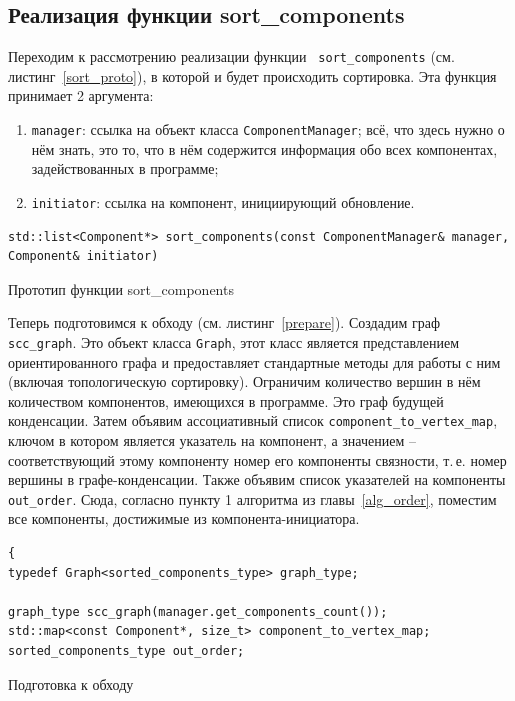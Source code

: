 \subsection{Реализация функции sort\_components}
Переходим к рассмотрению реализации функции \lstinline! sort_components! (см. листинг~\ref{sort_proto}), в которой и будет происходить сортировка. Эта функция принимает 2 аргумента:
\begin{enumerate}[1)]
	\item \lstinline!manager!: ссылка на объект класса \lstinline!ComponentManager!; всё, что здесь нужно о нём знать, это то, что в нём содержится информация обо всех компонентах, задействованных в программе;
	\item \lstinline!initiator!: ссылка на компонент, инициирующий обновление. 
\end{enumerate}

\begin{ListingEnv}[h]
	\begin{lstlisting}
std::list<Component*> sort_components(const ComponentManager& manager, Component& initiator)		
	\end{lstlisting}
	\caption{Прототип функции sort\_components}\label{sort_proto}
\end{ListingEnv}

Теперь подготовимся к обходу (см. листинг~\ref{prepare}). Создадим граф \lstinline!scc_graph!. Это объект класса \lstinline!Graph!, этот класс является представлением ориентированного графа и предоставляет стандартные методы для работы с ним (включая топологическую сортировку). Ограничим количество вершин в нём количеством компонентов, имеющихся в программе. Это граф будущей конденсации. Затем объявим ассоциативный список \lstinline!component_to_vertex_map!, ключом в котором является указатель на компонент, а значением -- соответствующий этому компоненту номер его компоненты связности, т.\,е. номер вершины в графе-конденсации. Также объявим список указателей на компоненты \lstinline!out_order!. Сюда, согласно пункту 1 алгоритма из главы~\ref{alg_order}, поместим все компоненты, достижимые из компонента-инициатора.
\begin{ListingEnv}[h]
	\begin{lstlisting}
{	
typedef Graph<sorted_components_type> graph_type;

graph_type scc_graph(manager.get_components_count());
std::map<const Component*, size_t> component_to_vertex_map;
sorted_components_type out_order;
	\end{lstlisting}
	\caption{Подготовка к обходу}\label{prepare}
\end{ListingEnv}

